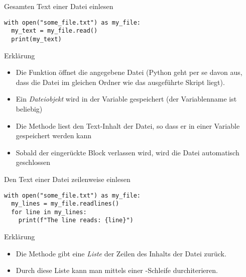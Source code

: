 \begin{fragile}
\begin{block}{Gesamten Text einer Datei einlesen}
\vspace{2pt}
\pause 
\begin{verbatim}
with open("some_file.txt") as my_file:
  my_text = my_file.read()
  print(my_text)
\end{verbatim}

\pause
\vspace{12pt}

\begin{exampleblock}{Erklärung}
\vspace{2pt}
\begin{itemize}[<+->]
	\item Die Funktion  öffnet die angegebene Datei (Python geht per se davon aus, dass die Datei im gleichen Ordner wie das ausgeführte Skript liegt).
	\item Ein \emph{Dateiobjekt} wird in der Variable  gespeichert (der Variablenname ist beliebig)
	\item Die Methode  liest den Text-Inhalt der Datei, so dass er in einer Variable gespeichert werden kann 
	\item Sobald der eingerückte Block verlassen wird, wird die Datei automatisch geschlossen
\end{itemize}
\end{exampleblock}

\end{block}
\end{fragile}

\begin{fragile}
\begin{block}{Den Text einer Datei zeilenweise einlesen}
\pause 
\vspace{2pt}

\begin{verbatim}
with open("some_file.txt") as my_file:
  my_lines = my_file.readlines()
  for line in my_lines:
    print(f"The line reads: {line}")
\end{verbatim}

\pause
\vspace{12pt}

\begin{exampleblock}{Erklärung}
\vspace{2pt}
\begin{itemize}[<+->]
\item Die Methode  gibt eine \emph{Liste} der Zeilen des Inhalts der Datei  zurück. 
\item Durch diese Liste kann man mittels einer -Schleife durchiterieren. 
\end{itemize}
\end{exampleblock}
\end{block}
\end{fragile}

